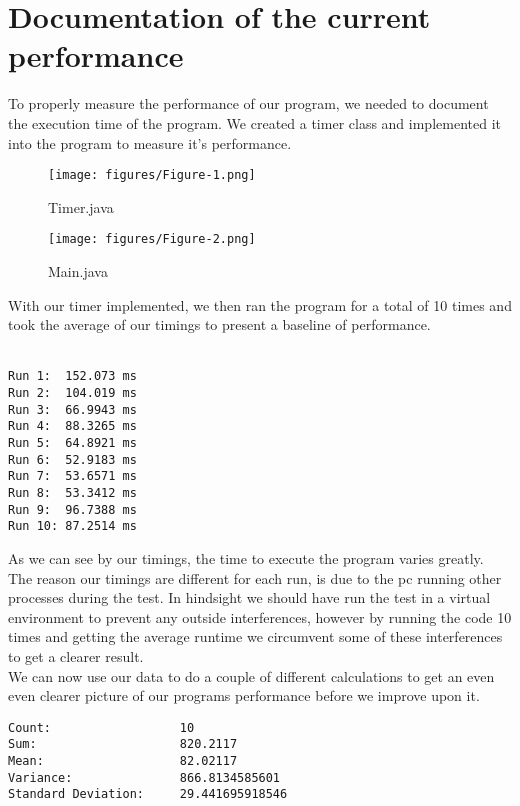 \section{Documentation of the current performance}

To properly measure the performance of our program, we needed to document the execution time of the program.
We created a timer class and implemented it into the program to measure it's performance. 

\begin{figure}[h]
    \caption{Timer.java}
    \texttt{[image: figures/Figure-1.png]}
    \label{fig:timer-class}
\end{figure}

\begin{figure}[h]
    \caption{Main.java}
    \texttt{[image: figures/Figure-2.png]}
    \label{fig:main-cass}
\end{figure}

With our timer implemented, we then ran the program for a total of 10 times and took the average of our timings to present a baseline of performance.\\\\

\begin{lstlisting}[]
Run 1:  152.073 ms
Run 2:  104.019 ms
Run 3:  66.9943 ms
Run 4:  88.3265 ms
Run 5:  64.8921 ms
Run 6:  52.9183 ms
Run 7:  53.6571 ms
Run 8:  53.3412 ms
Run 9:  96.7388 ms
Run 10: 87.2514 ms
\end{lstlisting}

\pagebreak
As we can see by our timings, the time to execute the program varies greatly.\\
The reason our timings are different for each run, is due to the pc running other processes during the test. In hindsight we should have run the test in a virtual environment to prevent any outside interferences, however by running the code 10 times and getting the average runtime we circumvent some of these interferences to get a clearer result.\\

We can now use our data to do a couple of different calculations to get an even even clearer picture of our programs performance before we improve upon it.\\
\begin{lstlisting}[]
Count:                  10
Sum:                    820.2117
Mean:                   82.02117
Variance:               866.8134585601
Standard Deviation:     29.441695918546
\end{lstlisting}